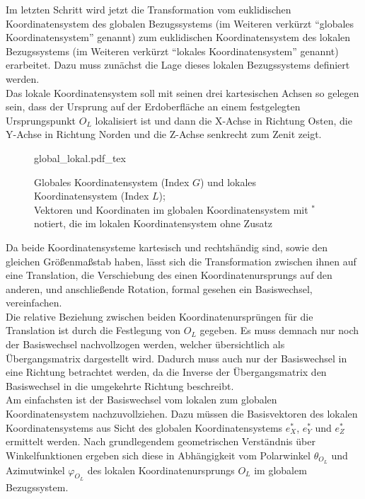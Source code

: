 Im letzten Schritt wird jetzt die Transformation vom euklidischen Koordinatensystem des globalen Bezugssystems (im Weiteren verkürzt ``globales Koordinatensystem'' genannt) zum euklidischen Koordinatensystem des lokalen Bezugssystems (im Weiteren verkürzt ``lokales Koordinatensystem'' genannt) erarbeitet. Dazu muss zunächst die Lage dieses lokalen Bezugssystems definiert werden.\\
Das lokale Koordinatensystem soll mit seinen drei kartesischen Achsen so gelegen sein, dass der Ursprung auf der Erdoberfläche an einem festgelegten Ursprungspunkt $O_L$ lokalisiert ist und dann die X-Achse in Richtung Osten, die Y-Achse in Richtung Norden und die Z-Achse senkrecht zum Zenit zeigt.\kleinerabstand

\begin{figure}[H]
	\centering
	\def\svgwidth{10.3cm}
	{global_lokal.pdf_tex}
	\caption[Globales Koordinatensystem und lokales Koordinatensystem]{Globales Koordinatensystem (Index $G$) und lokales Koordinatensystem (Index $L$);\\
	Vektoren und Koordinaten im globalen Koordinatensystem mit $^*$ notiert, die im lokalen Koordinatensystem ohne Zusatz}
	\label{fig:global_lokal}
\end{figure}

\noindent Da beide Koordinatensysteme kartesisch und rechtshändig sind, sowie den gleichen Größenmaßstab haben, lässt sich die Transformation zwischen ihnen auf eine Translation, die Verschiebung des einen Koordinatenursprungs auf den anderen, und anschließende Rotation, formal gesehen ein Basiswechsel, vereinfachen.\\
Die relative Beziehung zwischen beiden Koordinatenursprüngen für die Translation ist durch die Festlegung von $O_L$ gegeben. Es muss demnach nur noch der Basiswechsel nachvollzogen werden, welcher übersichtlich als Übergangsmatrix dargestellt wird. Dadurch muss auch nur der Basiswechsel in eine Richtung betrachtet werden, da die Inverse der Übergangsmatrix den Basiswechsel in die umgekehrte Richtung beschreibt.\\
Am einfachsten ist der Basiswechsel vom lokalen zum globalen Koordinatensystem nachzuvollziehen. Dazu müssen die Basisvektoren des lokalen Koordinatensystems aus Sicht des globalen Koordinatensystems $e_X^*$, $e_Y^*$ und $e_Z^*$ ermittelt werden. Nach grundlegendem geometrischen Verständnis über Winkelfunktionen ergeben sich diese in Abhängigkeit vom Polarwinkel $\theta_{O_L}$ und Azimutwinkel $\varphi_{O_L}$ des lokalen Koordinatenursprungs $O_L$ im globalem Bezugssystem.\kleinerabstand

